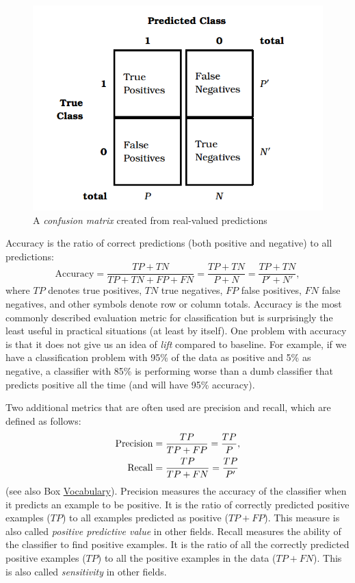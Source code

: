 \documentclass[]{krantz}
\begin{document}
\begin{figure}

{\centering \includegraphics[width=0.7\linewidth]{ChapterML/figures/cm} 

}

\caption{A \textit{confusion matrix} created from real-valued predictions}\label{fig:cm}
\end{figure}

Accuracy is the ratio of correct predictions (both positive and
negative) to all predictions:
\[\textrm{Accuracy}=\frac{TP + TN}{TP + TN + FP + FN}=\frac{TP + TN}{P+N}=\frac{TP + TN}{P'+N'},\]
where \(TP\) denotes true positives, \(TN\) true negatives, \(FP\) false
positives, \(FN\) false negatives, and other symbols denote row or
column totals. Accuracy is the most commonly described evaluation metric
for classification but is surprisingly the least useful in practical
situations (at least by itself). One problem with accuracy is that it
does not give us an idea of \emph{lift} compared to baseline. For
example, if we have a classification problem with 95\% of the data as
positive and 5\% as negative, a classifier with 85\% is performing worse
than a dumb classifier that predicts positive all the time (and will
have 95\% accuracy).

Two additional metrics that are often used are precision and recall,
which are defined as follows: \[\begin{aligned}
{\rm Precision} &= \frac{TP}{TP + FP}=\frac{TP}{P},
\\
{\rm Recall} &= \frac{TP}{TP + FN}=\frac{TP}{P'}
\end{aligned}\] (see also Box \protect\hyperlink{box:ml3}{Vocabulary}).
Precision measures the accuracy of the classifier when it predicts an
example to be positive. It is the ratio of correctly predicted positive
examples (\(TP\)) to all examples predicted as positive (\(TP + FP\)).
This measure is also called \emph{positive predictive value} in other
fields. Recall measures the ability of the classifier to find positive
examples. It is the ratio of all the correctly predicted positive
examples (\(TP\)) to all the positive examples in the data
(\(TP + FN\)). This is also called \emph{sensitivity} in other fields.
\end{document}
